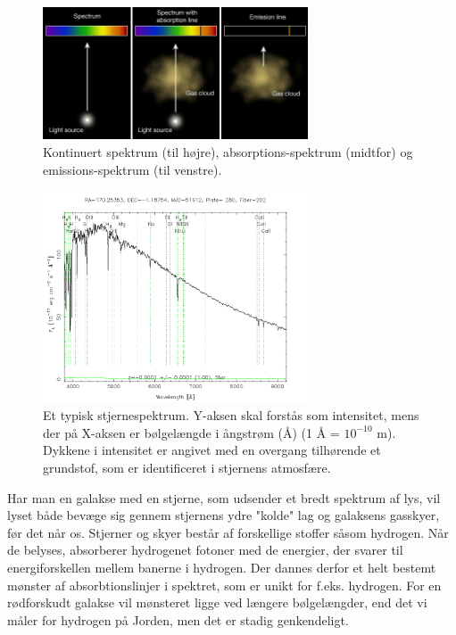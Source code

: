 \begin{figure}[h]
	\centering
	\includegraphics[width=0.7\textwidth]{Astrofysik/Astrofig/kirchoffslaws.jpg}
	\caption{Kontinuert spektrum (til højre), absorptions-spektrum (midtfor) og
		emissions-spektrum (til venstre). }
	\label{kirchoff}
\end{figure}

\begin{figure}[h!]
	\centering
	\includegraphics[width=0.7\textwidth]{Astrofysik/Astrofig/spektrum.png}
	\caption{Et typisk stjernespektrum. Y-aksen skal forstås som intensitet, mens der
		på X-aksen er bølgelængde i ångstrøm (Å) (1 Å = $10^{-10}$ m). Dykkene i intensitet
		er angivet med en overgang tilhørende et grundstof, som er identificeret i stjernens
		atmosfære. }
	\label{shapes}
\end{figure}

Har man en galakse med en stjerne, som udsender et bredt spektrum af lys, vil lyset både bevæge sig gennem stjernens ydre "kolde" lag og galaksens gasskyer, før det når os. Stjerner og skyer består af forskellige stoffer såsom hydrogen. Når de belyses, absorberer hydrogenet fotoner med de energier, der svarer til energiforskellen mellem banerne i hydrogen. Der dannes derfor et helt bestemt mønster af absorbtionslinjer i spektret, som er unikt for f.eks. hydrogen. For en rødforskudt galakse vil mønsteret ligge ved længere bølgelængder, end det vi måler for hydrogen på Jorden, men det er stadig genkendeligt.

